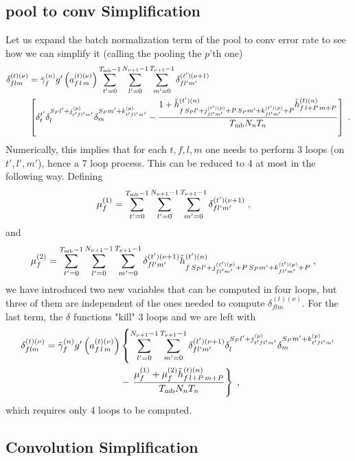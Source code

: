 \begin{subappendices}
\subsection{pool to conv Simplification}

Let us expand the batch normalization term of the pool to conv error rate to see how we can simplify it (calling the pooling the $p$'th one)
\begin{align}
\delta^{(t)(\nu)}_{flm}&=\tilde{\gamma}^{(n)}_fg'\left(a_{f\,l\,m}^{(t)(\nu)}\right)
%
\sum_{t'=0}^{T_{{\rm mb}}-1}\sum^{N_{\nu+1}-1}_{l'=0}\sum^{T_{\nu+1}-1}_{m'=0}\delta_{fl'm'}^{(t')(\nu+1)}\notag\\
%
&\left[\delta^{t'}_t\delta^{S_P l'+j_{t'fl'm'}^{(p)}}_l\delta^{S_Pm'+k_{t'fl'm'}^{(p)}}_m-
%
\frac{1+\tilde{h}_{f\,S_P l'+j_{fl'm'}^{(t')(p)}+P\,S_Pm'+k_{fl'm'}^{(t')(p)}+P}^{(t')(n)}\tilde{h}_{f\,l+P\,m+P}^{(t)(n)}}{T_{{\rm mb}}N_nT_n}\right]\;.
\end{align}
Numerically, this implies that for each $t,f,l,m$ one needs to perform 3 loops (on $t',l',m'$), hence a 7 loop process. This can be reduced to 4 at most in the following way. Defining
\begin{align}
\mu_f^{(1)}&=
%
\sum_{t'=0}^{T_{{\rm mb}}-1}\sum^{N_{\nu+1}-1}_{l'=0}\sum^{T_{\nu+1}-1}_{m'=0}
%
\delta_{fl'm'}^{(t')(\nu+1)}\;,
\end{align}
and
\begin{align}
\mu_f^{(2)}&=
%
\sum_{t'=0}^{T_{{\rm mb}}-1}\sum^{N_{\nu+1}-1}_{l'=0}\sum^{T_{\nu+1}-1}_{m'=0}\delta_{fl'm'}^{(t')(\nu+1)}
%
\tilde{h}_{f\,S_P l'+j_{fl'm'}^{(t')(p)}+P\,S_Pm'+k_{fl'm'}^{(t')(p)}+P}^{(t')(n)}\;,
\end{align}
we have introduced two new variables that can be computed in four loops, but three of them are independent of the ones needed to compute $\delta^{(t)(\nu)}_{flm}$. For the last term, the $\delta$ functions "kill" 3 loops and we are left with
\begin{align}
\delta^{(t)(\nu)}_{flm}=\tilde{\gamma}^{(n)}_fg'\left(a_{f\,l\,m}^{(t)(\nu)}\right)&\left\{
%
\sum^{N_{\nu+1}-1}_{l'=0}\sum^{T_{\nu+1}-1}_{m'=0}\delta_{fl'm'}^{(t')(\nu+1)}
%
\delta^{S_P l'+j_{t'fl'm'}^{(p)}}_l\delta^{S_Pm'+k_{t'fl'm'}^{(p)}}_m\right.\notag\\
%
&-\left.
%
\frac{\mu_f^{(1)}+\mu_f^{(2)}\tilde{h}_{f\,l+P\,m+P}^{(t)(n)}}{T_{{\rm mb}}N_nT_n}\right\}\;,
\end{align}
which requires only 4 loops to be computed.

\subsection{Convolution Simplification}


\end{subappendices}
